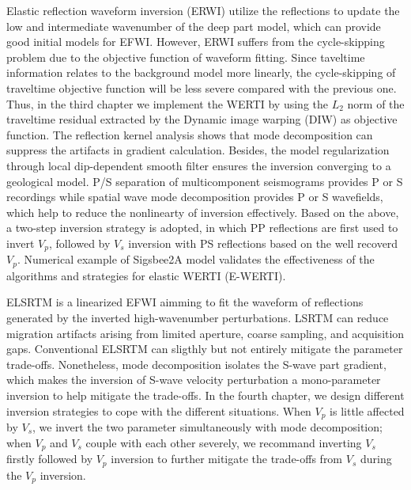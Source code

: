 \begin{eabstract}
Elastic reflection waveform inversion (ERWI) utilize the reflections to update the low and
intermediate wavenumber of
the deep part model, which can provide good initial models for EFWI. However, ERWI suffers from
the cycle-skipping problem due to the objective function of waveform fitting. Since taveltime
information relates to the background model more linearly, the cycle-skipping of traveltime
objective function will be less severe
compared with the previous one. Thus, in the third chapter we implement the WERTI by using the $L_2$ norm of the traveltime
residual extracted by the Dynamic image warping (DIW) as objective function.
The reflection kernel analysis shows that mode decomposition can suppress the artifacts in
gradient calculation. 
Besides, the model regularization through local dip-dependent smooth filter ensures the inversion converging to a
geological model. 
P/S
separation of multicomponent seismograms provides P or S recordings while spatial wave mode
decomposition provides P or S wavefields, which help
to  reduce the nonlinearty of inversion effectively.
Based on the above, a two-step inversion strategy is adopted, in which PP reflections are first used to invert $V_p$,
followed by $V_s$ inversion with PS reflections based on the well recoverd $V_p$. 
Numerical example of Sigsbee2A model validates the effectiveness of the
algorithms and strategies for elastic WERTI (E-WERTI).

ELSRTM is a linearized EFWI aimming to fit the waveform of reflections generated by the inverted
high-wavenumber perturbations. 
LSRTM can reduce migration artifacts arising
from limited aperture, coarse sampling, and acquisition gaps. Conventional ELSRTM can sligthly but
not entirely mitigate the parameter trade-offs. 
Nonetheless, mode decomposition
isolates the S-wave part gradient, which makes the inversion of S-wave velocity
perturbation a mono-parameter inversion to help mitigate the trade-offs. In the fourth chapter, we
design different inversion strategies to cope with the different situations. When $V_p$ is little
affected by $V_s$, we invert the two parameter simultaneously with mode decomposition; when $V_p$
and $V_s$ couple with each
other severely, we recommand inverting $V_s$ firstly followed by $V_p$ inversion to further mitigate
the trade-offs from $V_s$ during the $V_p$ inversion.


\end{eabstract}
